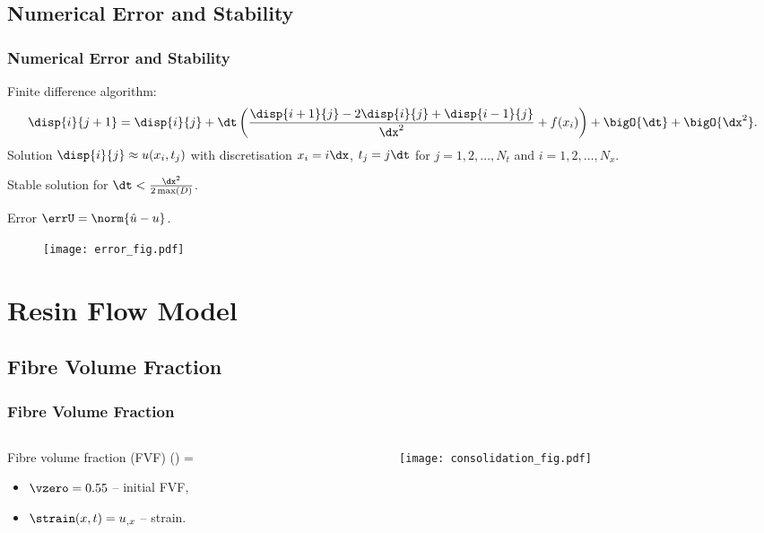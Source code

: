 \documentclass[compress]{beamer}%
\newenvironment{myalign}
{\align\color{\notcolor}}
{
  \nonumber
  \endalign
  \vspace{-1em}
}
\begin{document}
\subsection{Numerical Error and Stability}
\begin{frame}
\frametitle{Numerical Error and Stability}

Finite difference algorithm:
\begin{align}
  \disp{i}{j+1}  =   \disp{i}{j} + \dt\left(\frac{\disp{i+1}{j} - 2\disp{i}{j} + \disp{i-1}{j}}{\dx^2}   + f(x_i) \right) +
\bigO{\dt} + \bigO{\dx^2}. \nonumber
   \label{eq:findiff-alg}
\end{align}
%
Solution $\disp{i}{j}\approx u(x_i,t_j)$ with discretisation
$ x_i = i\dx$, $ t_j = j\dt$ for $j = 1, 2, \dots, N_t$ and
$i = 1, 2, \dots, N_x$.

Stable solution for $  \dt < \frac{\dx^2}{2\max(D)}$.

Error $\errU = \norm{\hat{u} - u}$.
%
\begin{figure}
  \centering
  \texttt{[image: error\_fig.pdf]}
  \label{fig:error-analysis}
\end{figure}

\end{frame}


\section{Resin Flow Model}



\subsection{Fibre Volume Fraction}

\begin{frame}
  \frametitle{Fibre Volume Fraction}

  \begin{columns}
    \begin{column}{0.6\linewidth}
      Fibre volume fraction (FVF)
        \begin{myalign} 
          \vfrac(\strain) = 
        \end{myalign}
        \begin{itemize}
        \item $\vzero=0.55$ -- initial FVF,
        \item $\strain(x,t) = u_{,x}$ -- strain.
        \end{itemize}
    \end{column}
    \begin{column}{0.4\linewidth}
      \texttt{[image: consolidation\_fig.pdf]}
    \end{column}
  \end{columns}
\end{frame}
\end{document}

